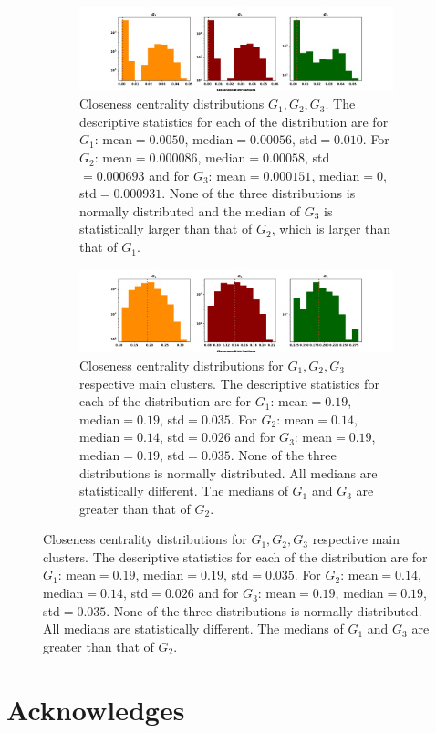 \documentclass{article}
\theoremstyle{definition}
\begin{document}
\begin{figure}[!hbtp]
    \centering
    \begin{subfigure}{\textwidth}\centering
    \includegraphics[width=\textwidth]{./assets/images/closeness_distributions.pdf}
    \caption{Closeness centrality distributions \(G_1, G_2, G_3\). The descriptive
        statistics for each of the distribution are for \(G_1\): mean\(=0.0050\),
        median\(=0.00056\), std\(=0.010\). For \(G_2\): mean\(=0.000086\), median\(=0.00058\),
        std\(=0.000693\) and for \(G_3\): mean\(=0.000151\), median\(=0\), std\(=0.000931\).
        None of the three distributions is normally distributed and the median
        of \(G_3\) is statistically larger than that of \(G_2\), which is
        larger than that of \(G_1\).}\label{fig:closeness_dist}
\end{subfigure}
\begin{subfigure}{\textwidth}\centering
    \centering
    \includegraphics[width=\textwidth]{./assets/images/closeness_distributions_clusters.pdf}
    \caption{Closeness centrality distributions for \(G_1, G_2, G_3\) respective
    main clusters. The descriptive statistics for each of the distribution are
    for \(G_1\): mean\(=0.19\),
    median\(=0.19\), std\(=0.035\). For \(G_2\): mean\(=0.14\), median\(=0.14\),
    std\(=0.026\) and for \(G_3\): mean\(=0.19\), median\(=0.19\), std\(=0.035\).
    None of the three distributions is normally distributed. All medians
    are statistically different. The medians of \(G_1\) and \(G_3\) are greater
    than that of \(G_2\).}\label{fig:closeness_dist_cluster}
    \end{subfigure}
\end{figure}

\section{Acknowledges}
\end{document}
